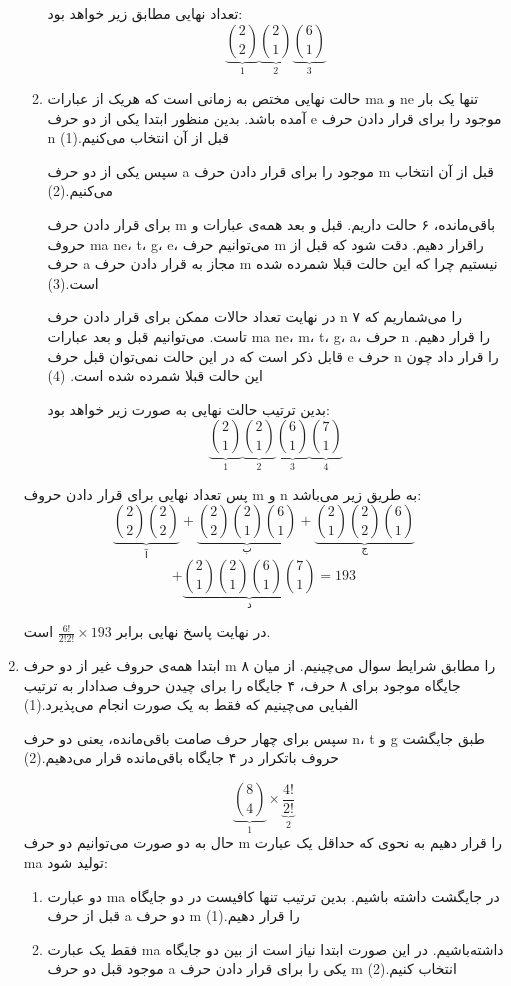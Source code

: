 \begin{enumerate}
\begin{enumerate}
      \p
      تعداد نهایی مطابق زیر خواهد بود:
      $$\underbrace{{2\choose 2}}_{1}\underbrace{{2 \choose 1}}_{2}\underbrace{{6\choose 1}}_{3}$$
      
      \item
      \p
      حالت نهایی مختص به زمانی است که هریک از عبارات ma و ne تنها یک بار آمده باشد.
      بدین منظور ابتدا یکی از دو حرف e موجود را برای قرار دادن حرف n قبل از آن انتخاب می‌کنیم.(1)
      
      \p
      سپس یکی از دو حرف a موجود را برای قرار دادن حرف m قبل از آن انتخاب می‌کنیم.(2)
      
      \p
      برای قرار دادن حرف m باقی‌مانده، ۶ حالت داریم.
      قبل و بعد همه‌ی عبارات و حروف 
      ma 
      ne، t، g، e،
      می‌توانیم حرف m راقرار دهیم.
      دقت شود که قبل از حرف a مجاز به قرار دادن حرف m نیستیم چرا که این حالت قبلا شمرده شده است.(3)
      
      \p
      در نهایت تعداد حالات ممکن برای قرار دادن حرف n را
      می‌شماریم که ۷ تاست. می‌توانیم قبل و بعد عبارات
      ma
      ne،
      m،
      t، g، a،
      حرف n را قرار دهیم.
      قابل ذکر است که در این حالت نمی‌توان قبل حرف e
      حرف n را قرار داد چون این حالت قبلا شمرده شده است.
      (4)
      
      \p
      بدین ترتیب حالت نهایی به صورت زیر خواهد بود:
      $$\underbrace{{2\choose 1}}_{1}\underbrace{{2\choose 1}}_{2}\underbrace{{6\choose 1}}_{3}\underbrace{{7\choose 1}}_{4}$$
    \end{enumerate}
    \p
    پس تعداد نهایی برای قرار دادن حروف m و n به طریق زیر می‌باشد:
    $$\underbrace{{2 \choose 2}{2 \choose 2}}_{\text{آ}} + \underbrace{{2\choose 2}{2 \choose 1}{6\choose 1}}_{\text{ب}} + \underbrace{{2\choose 1}{2\choose 2}{6\choose 1}}_{\text{ج}}$$
    $$+ \underbrace{{2\choose 1}{2\choose 1}{6\choose 1}{7\choose 1}}_{\text{د}} = 193$$

    در نهایت پاسخ نهایی برابر $\frac{6!}{2!2!} \times 193$ است.
    \item
    \p
    ابتدا همه‌ی حروف غیر از دو حرف m را مطابق شرایط سوال می‌چینیم.
    از میان ۸ جایگاه موجود برای ۸ حرف، ۴ جایگاه را برای چیدن حروف صدادار به ترتیب الفبایی می‌چینیم که فقط به یک صورت انجام می‌پذیرد.(1)
    
    \p
    سپس برای چهار حرف صامت باقی‌مانده، یعنی دو حرف n،
    t و g
    طبق جایگشت حروف باتکرار در ۴ جایگاه باقی‌مانده قرار می‌دهیم.(2)
    
    $$\underbrace{{8\choose 4}}_{1} \times \underbrace{\frac{4!}{2!}}_{2}$$
    حال به دو صورت می‌توانیم دو حرف m را قرار دهیم به نحوی که حداقل یک عبارت 
    ma تولید شود:
    \begin{enumerate}
      \item 
      \p
      دو عبارت ma در جایگشت داشته باشیم. بدین ترتیب تنها کافیست در دو جایگاه قبل از حرف a دو حرف m را قرار دهیم.(1)
      \item
      \p
      فقط یک عبارت ma داشته‌باشیم. در این صورت ابتدا نیاز است از بین دو جایگاه موجود قبل دو حرف a یکی را برای قرار دادن حرف m انتخاب کنیم.(2)
      

\end{enumerate}
\end{enumerate}
